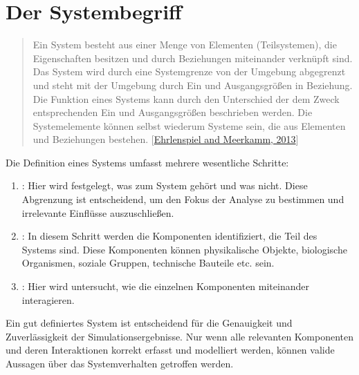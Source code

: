 \documentclass[letterpaper,10pt,german]{jupyterBook}
\begin{document}
\section{Der Systembegriff}
\label{\detokenize{chapters/chapter1/Einf_xfchrung_Konstruktion:der-systembegriff}}\begin{quote}

\sphinxAtStartPar
Ein System besteht aus einer Menge von Elementen (Teilsystemen), die Eigenschaften besitzen und durch Beziehungen miteinander verknüpft sind. Das System wird durch eine Systemgrenze von der Umgebung abgegrenzt und steht mit der Umgebung durch Ein\sphinxhyphen{} und Ausgangsgrößen in Beziehung. Die Funktion eines Systems kann durch den Unterschied der dem Zweck entsprechenden Ein\sphinxhyphen{} und Ausgangsgrößen beschrieben werden. Die Systemelemente können selbst wiederum Systeme sein, die aus Elementen und Beziehungen bestehen. {[}\hyperlink{cite.quellen:id15}{Ehrlenspiel and Meerkamm, 2013}{]}
\end{quote}

\sphinxAtStartPar
Die Definition eines Systems umfasst mehrere wesentliche Schritte:
\begin{enumerate}
%
\item {} 
\sphinxAtStartPar
{}: Hier wird festgelegt, was zum System gehört und was nicht. Diese Abgrenzung ist entscheidend, um den Fokus der Analyse zu bestimmen und irrelevante Einflüsse auszuschließen.

\item {} 
\sphinxAtStartPar
{}: In diesem Schritt werden die Komponenten identifiziert, die Teil des Systems sind. Diese Komponenten können physikalische Objekte, biologische Organismen, soziale Gruppen, technische Bauteile etc. sein.

\item {} 
\sphinxAtStartPar
{}: Hier wird untersucht, wie die einzelnen Komponenten miteinander interagieren.

\end{enumerate}

\sphinxAtStartPar
Ein gut definiertes System ist entscheidend für die Genauigkeit und Zuverlässigkeit der Simulationsergebnisse. Nur wenn alle relevanten Komponenten und deren Interaktionen korrekt erfasst und modelliert werden, können valide Aussagen über das Systemverhalten getroffen werden.
\end{document}

